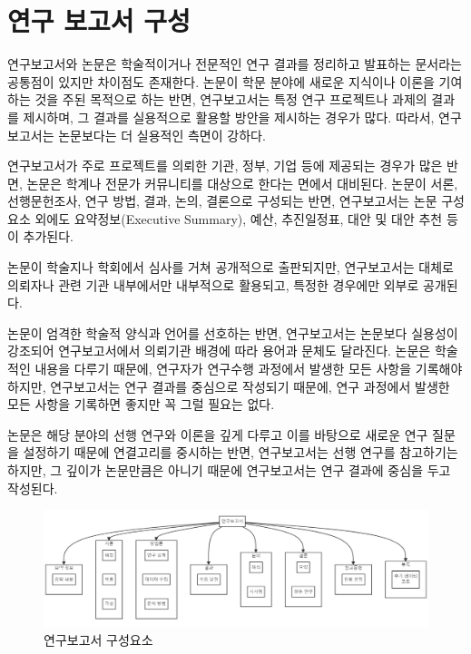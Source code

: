 \documentclass[
  letterpaper,
]{book}
\begin{document}
\hypertarget{uxc5f0uxad6c-uxbcf4uxace0uxc11c-uxad6cuxc131}{%
\section{연구 보고서
구성}\label{uxc5f0uxad6c-uxbcf4uxace0uxc11c-uxad6cuxc131}}

연구보고서와 논문은 학술적이거나 전문적인 연구 결과를 정리하고 발표하는
문서라는 공통점이 있지만 차이점도 존재한다. 논문이 학문 분야에 새로운
지식이나 이론을 기여하는 것을 주된 목적으로 하는 반면, 연구보고서는 특정
연구 프로젝트나 과제의 결과를 제시하며, 그 결과를 실용적으로 활용할
방안을 제시하는 경우가 많다. 따라서, 연구보고서는 논문보다는 더 실용적인
측면이 강하다.

연구보고서가 주로 프로젝트를 의뢰한 기관, 정부, 기업 등에 제공되는
경우가 많은 반면, 논문은 학계나 전문가 커뮤니티를 대상으로 한다는 면에서
대비된다. 논문이 서론, 선행문헌조사, 연구 방법, 결과, 논의, 결론으로
구성되는 반면, 연구보고서는 논문 구성요소 외에도 요약정보(Executive
Summary), 예산, 추진일정표, 대안 및 대안 추천 등이 추가된다.

논문이 학술지나 학회에서 심사를 거쳐 공개적으로 출판되지만, 연구보고서는
대체로 의뢰자나 관련 기관 내부에서만 내부적으로 활용되고, 특정한
경우에만 외부로 공개된다.

논문이 엄격한 학술적 양식과 언어를 선호하는 반면, 연구보고서는 논문보다
실용성이 강조되어 연구보고서에서 의뢰기관 배경에 따라 용어과 문체도
달라진다. 논문은 학술적인 내용을 다루기 때문에, 연구자가 연구수행
과정에서 발생한 모든 사항을 기록해야 하지만, 연구보고서는 연구 결과를
중심으로 작성되기 때문에, 연구 과정에서 발생한 모든 사항을 기록하면
좋지만 꼭 그럴 필요는 없다.

논문은 해당 분야의 선행 연구와 이론을 깊게 다루고 이를 바탕으로 새로운
연구 질문을 설정하기 때문에 연결고리를 중시하는 반면, 연구보고서는 선행
연구를 참고하기는 하지만, 그 깊이가 논문만큼은 아니기 때문에
연구보고서는 연구 결과에 중심을 두고 작성된다.

\begin{figure}

{\centering \includegraphics{images/mermaid_report.png}

}

\caption{연구보고서 구성요소}

\end{figure}
\end{document}
